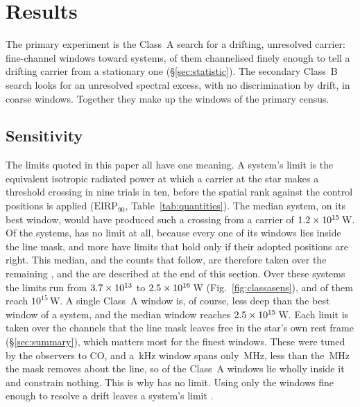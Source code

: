 \section{Results}
\label{sec:results}

The primary experiment is the Class~A search for a drifting, unresolved
carrier: \NWinA{} fine-channel windows toward \NSysClassA{} systems,
\EdrNWinA{} of them channelised finely enough to tell a drifting carrier from
a stationary one (\S\ref{sec:statistic}). The secondary Class~B search looks
for an unresolved spectral excess, with no discrimination by drift, in
\NWinB{} coarse windows. Together they make up the \NWindows{} windows of the
primary census.

\subsection{Sensitivity}
\label{sec:pninetysel}

The limits quoted in this paper all have one meaning. A system's limit is
the equivalent isotropic radiated power at which a carrier at the star makes
a threshold crossing in nine trials in ten, before the spatial rank against
the control positions is applied ($\mathrm{EIRP}_{90}$,
Table~\ref{tab:quantities}). The median system, on its best window, would
have produced such a crossing from a carrier of $1.2\times10^{15}$\,W.
Of the \NSysClassA{} systems, \NSysALostName{} has no limit at all,
because every one of its windows lies inside the line mask, and
\OmNFlagWord{} more have limits that hold only if their adopted positions
are right. This median, and the counts that follow, are therefore taken over
the remaining \NSysALimSum, and the \OmNFlagWord{} are described at the end
of this section. Over these systems the limits run from $3.7\times10^{13}$ to
$2.5\times10^{16}$\,W (Fig.~\ref{fig:classasens}), and \NSysEfifteen{} of
them reach $10^{15}$\,W. A single Class~A window is, of course, less deep than
the best window of a system, and the median window reaches
$2.5\times10^{15}$\,W. Each limit is taken over the channels that the line
mask leaves free in the star's own rest frame (\S\ref{sec:summary}), which
matters most for the finest windows. These were tuned by the observers to CO,
and a \UmFineChanKHz\,kHz window spans only \UmFineBwMHz\,MHz, less than the
\UmFineMaskMHz\,MHz the mask removes about the line, so \UmNWinAFull{} of the
Class~A windows lie wholly inside it and constrain nothing. This is why
\NSysALostName{} has no limit. Using only the \EdrNWinA{} windows fine enough
to resolve a drift leaves a system's limit \ScEdrMedClause.

